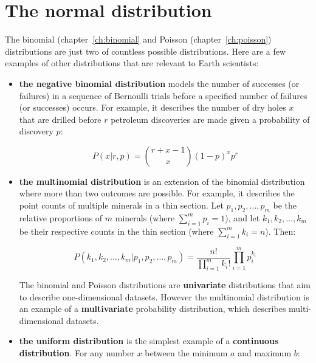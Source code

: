 \chapter{The normal distribution}
\label{ch:normal}

The binomial (chapter~\ref{ch:binomial} and Poisson
(chapter~\ref{ch:poisson}) distributions are just two of countless
possible distributions.  Here are a few examples of other
distributions that are relevant to Earth scientists:

\begin{itemize}

\item{\bf the negative binomial distribution} models the number of
  successes (or failures) in a sequence of Bernoulli trials before a
  specified number of failures (or successes) occurs. For example, it
  describes the number of dry holes $x$ that are drilled before $r$
  petroleum discoveries are made given a probability of discovery $p$:

  \begin{equation}
    P(x|r,p) = \binom{r+x-1}{x} (1-p)^x p^r
  \end{equation}

\item{\bf the multinomial distribution} is an extension of the
  binomial distribution where more than two outcomes are possible. For
  example, it describes the point counts of multiple minerals in a
  thin section. Let $p_1,p_2,\ldots,p_m$ be the relative proportions
  of $m$ minerals (where $\sum_{i=1}^{m}p_i=1$), and let
  $k_1,k_2,\ldots,k_m$ be their respective counts in the thin section
  (where $\sum_{i=1}^{m}k_i=n$). Then:

  \begin{equation}
    P(k_1,k_2,\ldots,k_m|p_1,p_2,\ldots,p_m) =
    \frac{n!}{\prod\limits_{i=1}^{m}k_i!} \prod\limits_{i=1}^{m}p_i^{k_i}
  \end{equation}

  The binomial and Poisson distributions are \textbf{univariate}
  distributions that aim to describe one-dimensional datasets. However
  the multinomial distribution is an example of a
  \textbf{multivariate} probability distribution, which describes
  multi-dimensional datasets.

\item{\bf the uniform distribution} is the simplest example of a
  \textbf{continuous distribution}. For any number $x$ between the
  minimum $a$ and maximum $b$:


\end{itemize}
